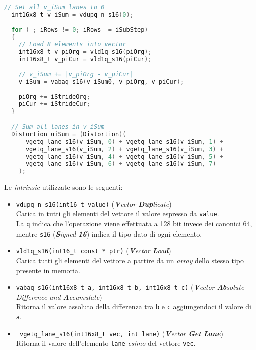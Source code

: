 \begin{lstlisting}[language=C]
  // Set all v_iSum lanes to 0
  int16x8_t v_iSum = vdupq_n_s16(0);
  
  for ( ; iRows != 0; iRows -= iSubStep)
  {
    // Load 8 elements into vector
    int16x8_t v_piOrg = vld1q_s16(piOrg);
    int16x8_t v_piCur = vld1q_s16(piCur);
    
    // v_iSum += |v_piOrg - v_piCur|
    v_iSum = vabaq_s16(v_iSum0, v_piOrg, v_piCur);
  
    piOrg += iStrideOrg;
    piCur += iStrideCur;
  }
  
  // Sum all lanes in v_iSum
  Distortion uiSum = (Distortion)(
      vgetq_lane_s16(v_iSum, 0) + vgetq_lane_s16(v_iSum, 1) +
      vgetq_lane_s16(v_iSum, 2) + vgetq_lane_s16(v_iSum, 3) +
      vgetq_lane_s16(v_iSum, 4) + vgetq_lane_s16(v_iSum, 5) +
      vgetq_lane_s16(v_iSum, 6) + vgetq_lane_s16(v_iSum, 7)
    );
\end{lstlisting}

Le \emph{intrinsic} utilizzate sono le seguenti:

\begin{itemize}
  \item \verb|vdupq_n_s16(int16_t value)| (\emph{\textbf{V}ector 
    \textbf{Dup}licate})\\
      Carica in tutti gli elementi del vettore il valore espresso da 
      \verb|value|.\\
      La \verb|q| indica che l'operazione viene effettuata a 128 bit invece dei 
      canonici 64, mentre \verb|s16| (\emph{\textbf{S}igned \textbf{16}}) 
      indica il tipo dato di ogni elemento.
  \item \verb|vld1q_s16(int16_t const * ptr)| (\emph{\textbf{V}ector 
    \textbf{L}oa\textbf{d}})\\
      Carica tutti gli elementi del vettore a partire da un \emph{array} dello 
      stesso tipo presente in memoria.
  \item \verb|vabaq_s16(int16x8_t a, int16x8_t b, int16x8_t c)| 
    (\emph{\textbf{V}ector \textbf{Ab}solute Difference and 
    \textbf{A}ccumulate})\\
      Ritorna il valore assoluto della differenza tra \verb|b| e \verb|c| 
      aggiungendoci il valore di \verb|a|.
  \item \verb| vgetq_lane_s16(int16x8_t vec, int lane)| (\emph{\textbf{V}ector 
    \textbf{Get} \textbf{Lane}})\\
      Ritorna il valore dell'elemento \verb|lane|-\emph{esimo} del vettore 
      \verb|vec|.      
\end{itemize}

